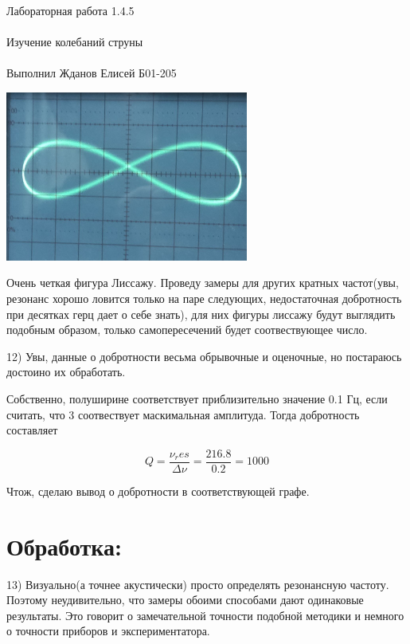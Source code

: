 \documentclass{astroedu-lab}
\begin{document}
\begin{problem}{\huge Лабораторная работа 1.4.5\\\\Изучение колебаний струны\\\\Выполнил Жданов Елисей Б01-205}
\begin{center}
\includegraphics[width=0.6\textwidth]{res.jpg}
\label{ris:image}
\end{center}

Очень четкая фигура Лиссажу. Проведу замеры для других кратных частот(увы, резонанс хорошо ловится только на паре следующих, недостаточная добротность при десятках герц дает о себе знать), для них фигуры лиссажу будут выглядить подобным образом, только самопересечений будет соотвествующее число.

12) Увы, данные о добротности весьма обрывочные и оценочные, но постараюсь достоино их обработать.

\begin{center}
\end{center}

Собственно, полуширине соответствует приблизительно значение 0.1 Гц, если считать, что 3 соотвествует маскимальная амплитуда. Тогда добротность составляет

\begin{equation}
	Q = \frac{\nu_res}{\Delta \nu} = \frac{216.8}{0.2} = 1000
\end{equation}

Чтож, сделаю вывод о добротности в соответствующей графе.

\section{Обработка:}


13) Визуально(а точнее акустически) просто определять резонансную частоту. Поэтому неудивительно, что замеры обоими способами дают одинаковые результаты. Это говорит о замечательной точности подобной методики и немного о точности приборов и экспериментатора.


\end{problem}
\end{document}
